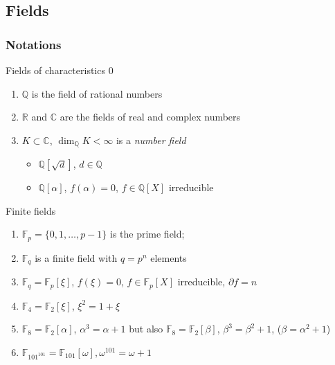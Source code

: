 \documentclass[handout]{beamer}%
\newcommand{\Q}{\mathbb Q}
\newcommand{\F}{\mathbb F}
\newcommand{\C}{\mathbb C}
\newcommand{\R}{\mathbb R}
\theoremstyle{definition}
\begin{document}
\subsection{Fields}

\begin{frame}
 \frametitle{Notations}

\begin{alertblock}{Fields of characteristics 0}
 \begin{enumerate}[<+-| alert@+>]
 \item $\Q$ is the field of rational numbers
\item $\R$ and $\C$ are the fields of real and complex numbers
\item $K\subset\C$, $\dim_\Q K<\infty$ is a \emph{number field}
\begin{itemize}
\item $\Q[\sqrt{d}]$, $d\in\Q$
\item $\Q[\alpha]$, $f(\alpha)=0$, $f\in\Q[X]$
irreducible
\end{itemize}
\end{enumerate}
\end{alertblock}

\begin{exampleblock}{Finite fields}
 \begin{enumerate}[<+-| alert@+>]
 \item $\F_p=\{0,1,\ldots,p-1\}$ is the prime field;
 \item $\F_q$ is a finite field with $q=p^n$ elements
 \item $\F_q=\F_p[\xi]$, $f(\xi)=0$, $f\in\F_p[X]$
irreducible, $\partial f=n$
\item $\F_4=\F_2[\xi]$, $\xi^2=1+\xi$
\item $\F_8=\F_2[\alpha]$, $\alpha^3=\alpha+1$ but also $\F_8=\F_2[\beta]$, $\beta^3=\beta^2+1$, ($\beta=\alpha^2+1$)
\item $\F_{101^{101}}=\F_{101}[\omega], \omega^{101}=\omega+1$
\end{enumerate}
\end{exampleblock}

\end{frame}
\end{document}
